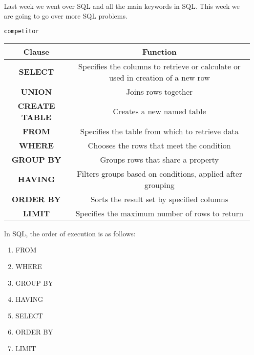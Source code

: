 Last week we went over SQL and all the main keywords in SQL. This week we are going to go over more SQL problems.

\begin{center}
    \lstinline{competitor}
    
    \begin{tabular}{|c|c|}
     \hline
     \textbf{Clause} & \textbf{Function} \\
     \hline
     \textbf{SELECT} & Specifies the columns to retrieve or calculate or used in creation of a new row \\
     \hline
     \textbf{UNION} & Joins rows together \\
     \hline
     \textbf{CREATE TABLE} & Creates a new named table \\
     \hline
     \textbf{FROM} & Specifies the table from which to retrieve data \\
     \hline
     \textbf{WHERE} & Chooses the rows that meet the condition \\
     \hline
     \textbf{GROUP BY} & Groups rows that share a property \\
     \hline
     \textbf{HAVING} & Filters groups based on conditions, applied after grouping \\
     \hline
     \textbf{ORDER BY} & Sorts the result set by specified columns \\
     \hline
     \textbf{LIMIT} & Specifies the maximum number of rows to return \\
     \hline
    \end{tabular}
\end{center}

In SQL, the order of execution is as follows:
\begin{enumerate}
    \item FROM
    \item WHERE
    \item GROUP BY
    \item HAVING
    \item SELECT
    \item ORDER BY
    \item LIMIT
\end{enumerate}